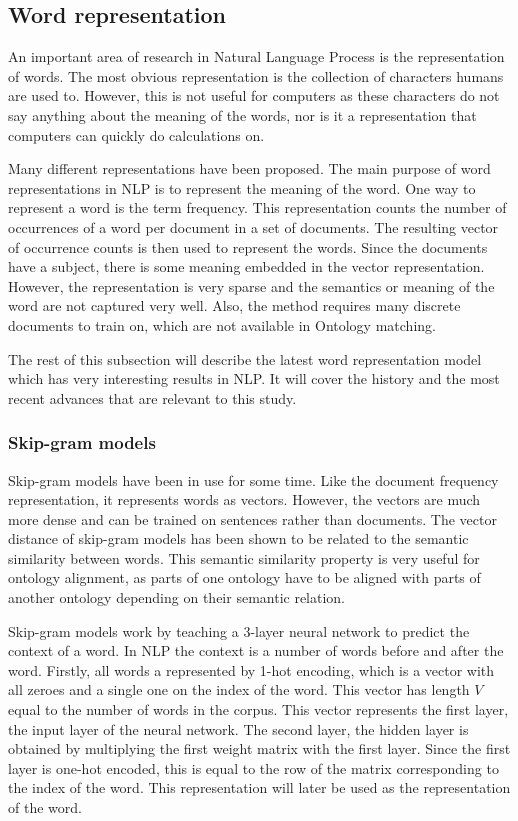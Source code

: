 \documentclass{article}
\begin{document}
 \subsection{Word representation} \label{w2v}
 An important area of research in Natural Language Process is the representation of words. The most obvious representation is the collection of characters humans are used to. However, this is not useful for computers as these characters do not say anything about the meaning of the words, nor is it a representation that computers can quickly do calculations on.
 
 Many different representations have been proposed. The main purpose of word representations in NLP is to represent the meaning of the word. One way to represent a word is the term frequency. This representation counts the number of occurrences of a word per document in a set of documents. The resulting vector of occurrence counts is then used to represent the words. Since the documents have a subject, there is some meaning embedded in the vector representation. However, the representation is very sparse and the semantics or meaning of the word are not captured very well. Also, the method requires many discrete documents to train on, which are not available in Ontology matching.
 
 The rest of this subsection will describe the latest word representation model which has very interesting results in NLP. It will cover the history and the most recent advances that are relevant to this study.
 
 \subsubsection{Skip-gram models}
 Skip-gram models have been in use for some time. Like the document frequency representation, it represents words as vectors. However, the vectors are much more dense and can be trained on sentences rather than documents. The vector distance of skip-gram models has been shown to be related to the semantic similarity between words. This semantic similarity property is very useful for ontology alignment, as parts of one ontology have to be aligned with parts of another ontology depending on their semantic relation.
 
 Skip-gram models work by teaching a 3-layer neural network to predict the context of a word. In NLP the context is a number of words before and after the word. Firstly, all words a represented by 1-hot encoding, which is a vector with all zeroes and a single one on the index of the word. This vector has length $V$ equal to the number of words in the corpus. This vector represents the first layer, the input layer of the neural network. The second layer, the hidden layer is obtained by multiplying the first weight matrix with the first layer. Since the first layer is one-hot encoded, this is equal to the row of the matrix corresponding to the index of the word. This representation will later be used as the representation of the word.
 
\end{document}

